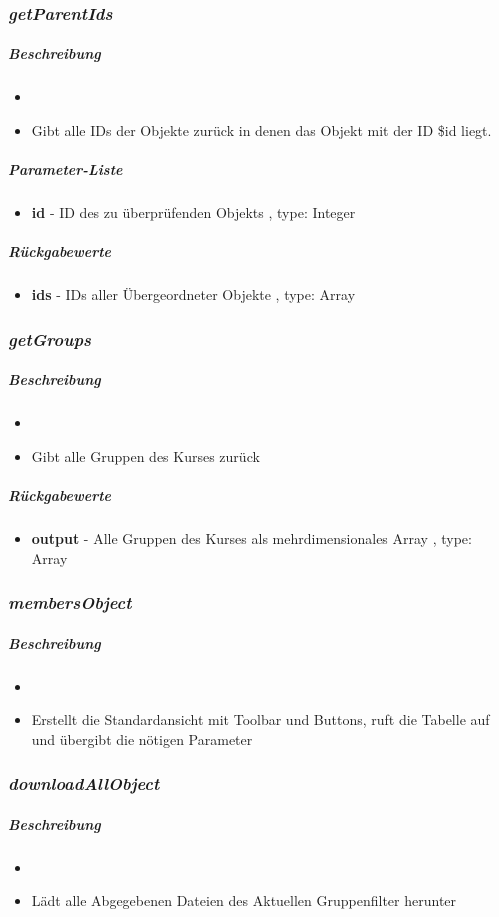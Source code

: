\subsubsection*{\textit{getParentIds}}\label{getParentIdsTGUI}
\subparagraph{Beschreibung}
\begin{itemize}
	\item[] \noindent{}
	\item[]  Gibt alle IDs der Objekte zurück in denen das Objekt mit der ID \$id liegt.
\end{itemize}
\subparagraph{Parameter-Liste}
\begin{itemize}
	\item[] \textbf{id} - ID des zu überprüfenden Objekts , type: Integer
\end{itemize}
\subparagraph{Rückgabewerte}
\begin{itemize}
	\item[] \textbf{ids} - IDs aller Übergeordneter Objekte , type: Array
\end{itemize}

\subsubsection*{\textit{getGroups}}\label{getGroupsTGUI}
\subparagraph{Beschreibung}
\begin{itemize}
	\item[] \noindent{}
	\item[] Gibt alle Gruppen des Kurses zurück
\end{itemize}
\subparagraph{Rückgabewerte}
\begin{itemize}
	\item[] \textbf{output} - Alle Gruppen des Kurses als mehrdimensionales Array , type: Array
\end{itemize}


\subsubsection*{\textit{membersObject}}\label{membersObjectTGUI}
\subparagraph{Beschreibung}
\begin{itemize}
	\item[] \noindent{}
	\item[] Erstellt die Standardansicht mit Toolbar und Buttons, ruft die Tabelle auf und übergibt die nötigen Parameter
\end{itemize}


\subsubsection*{\textit{downloadAllObject}}\label{downloadAllObjectTGUI}
\subparagraph{Beschreibung}
\begin{itemize}
	\item[] \noindent{}
	\item[] Lädt alle Abgegebenen Dateien des Aktuellen Gruppenfilter herunter
\end{itemize}

